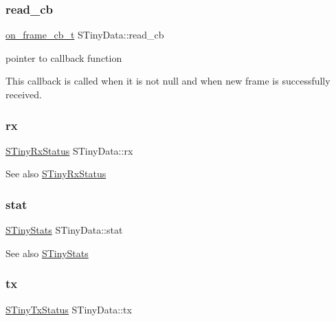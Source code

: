 \subsubsection{\texorpdfstring{read\+\_\+cb}{read\_cb}}
{\footnotesize\ttfamily \hyperlink{tiny__proto__types_8h_ad6bf709565b8aecb9e6ecf196f219d54}{on\+\_\+frame\+\_\+cb\+\_\+t} S\+Tiny\+Data\+::read\+\_\+cb}



pointer to callback function 

This callback is called when it is not null and when new frame is successfully received. \mbox{\label{structSTinyData_aa3b43db99a1a6bf3d562f932d5a539db}} 
\subsubsection{\texorpdfstring{rx}{rx}}
{\footnotesize\ttfamily \hyperlink{structSTinyRxStatus}{S\+Tiny\+Rx\+Status} S\+Tiny\+Data\+::rx}

\begin{DoxySeeAlso}{See also}
\hyperlink{structSTinyRxStatus}{S\+Tiny\+Rx\+Status} 
\end{DoxySeeAlso}
\mbox{\label{structSTinyData_a16ba8c9e60d6aee3fcd4909f85561f3d}} 
\subsubsection{\texorpdfstring{stat}{stat}}
{\footnotesize\ttfamily \hyperlink{structSTinyStats}{S\+Tiny\+Stats} S\+Tiny\+Data\+::stat}

\begin{DoxySeeAlso}{See also}
\hyperlink{structSTinyStats}{S\+Tiny\+Stats} 
\end{DoxySeeAlso}
\mbox{\label{structSTinyData_aa099adb35f3494332747eb18851fbb23}} 
\subsubsection{\texorpdfstring{tx}{tx}}
{\footnotesize\ttfamily \hyperlink{structSTinyTxStatus}{S\+Tiny\+Tx\+Status} S\+Tiny\+Data\+::tx}

